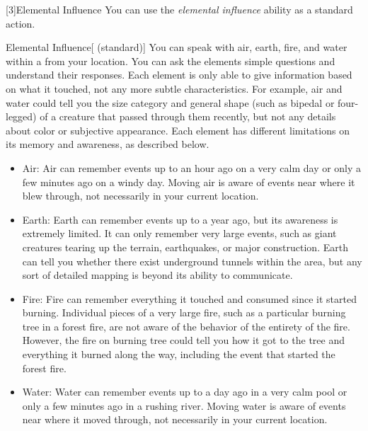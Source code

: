         [3]{Elemental Influence} You can use the \textit{elemental influence} ability as a standard action.
        \begin{freeability}{Elemental Influence}[ (standard)]
            You can speak with air, earth, fire, and water within a \areahuge {} from your location.
            You can ask the elements simple questions and understand their responses.
            Each element is only able to give information based on what it touched, not any more subtle characteristics.
            For example, air and water could tell you the size category and general shape (such as bipedal or four-legged) of a creature that passed through them recently, but not any details about color or subjective appearance.
            Each element has different limitations on its memory and awareness, as described below.

            \begin{itemize}
                \item Air: Air can remember events up to an hour ago on a very calm day or only a few minutes ago on a windy day.
                    Moving air is aware of events near where it blew through, not necessarily in your current location.
                \item Earth: Earth can remember events up to a year ago, but its awareness is extremely limited.
                    It can only remember very large events, such as giant creatures tearing up the terrain, earthquakes, or major construction.
                    Earth can tell you whether there exist underground tunnels within the area, but any sort of detailed mapping is beyond its ability to communicate.
                \item Fire: Fire can remember everything it touched and consumed since it started burning.
                    Individual pieces of a very large fire, such as a particular burning tree in a forest fire, are not aware of the behavior of the entirety of the fire.
                    However, the fire on burning tree could tell you how it got to the tree and everything it burned along the way, including the event that started the forest fire.
                \item Water: Water can remember events up to a day ago in a very calm pool or only a few minutes ago in a rushing river.
                    Moving water is aware of events near where it moved through, not necessarily in your current location.
            \end{itemize}
        \end{freeability}

